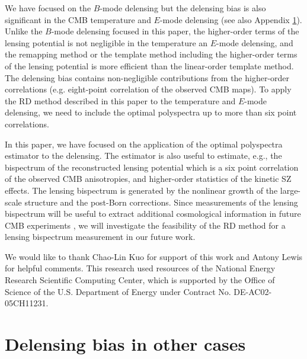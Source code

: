 \documentclass[aps,prd,twocolumn,superscriptaddress,groupedaddress,nofootinbib]{revtex4}
\begin{document}
We have focused on the $B$-mode delensing but the delensing bias is also significant in 
the CMB temperature and $E$-mode delensing \cite{Sehgal:2016,Carron:2017} (see also Appendix \ref{app:other}). 
Unlike the $B$-mode delensing focused in this paper, the higher-order terms of the lensing potential 
is not negligible in the temperature an $E$-mode delensing, and the remapping method or the template method 
including the higher-order terms of the lensing potential is more efficient than the linear-order template method. 
The delensing bias contains non-negligible contributions from the higher-order correlations 
(e.g. eight-point correlation of the observed CMB maps). 
To apply the RD method described in this paper to the temperature and $E$-mode delensing, 
we need to include the optimal polyspectra up to more than six point correlations. 

In this paper, we have focused on the application of the optimal polyspectra estimator to the delensing. 
The estimator is also useful to estimate, e.g., the bispectrum of the reconstructed 
lensing potential which is a six point correlation of the observed CMB anisotropies, and 
higher-order statistics of the kinetic SZ effects. 
The lensing bispectrum is generated by the nonlinear growth of the large-scale structure and 
the post-Born corrections. 
Since measurements of the lensing bispectrum will be useful to extract additional cosmological 
information in future CMB experiments \cite{Namikawa:2016b,Boehm:2016,Pratten:2016,Liu:2016nfs}, 
we will investigate the feasibility of the RD method for a lensing bispectrum measurement in our future work. 

\begin{acknowledgments}
We would like to thank Chao-Lin Kuo for support of this work and Antony Lewis for helpful comments. 
This research used resources of the National Energy Research Scientific Computing Center, 
which is supported by the Office of Science of the U.S. Department of Energy under Contract No. DE-AC02-05CH11231.
\end{acknowledgments}

\onecolumngrid
\appendix

\section{Delensing bias in other cases} \label{app:other}
\end{document}
